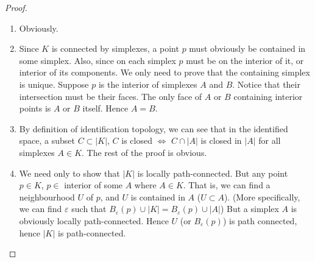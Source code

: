 \begin{proof}
\begin{enumerate}
    \item Obviously.
    \item Since $K$ is connected by simplexes, a point $p$ must
        obviously be contained in some simplex. Also, since on each
        simplex $p$ must be on the interior of it, or interior of its
        components. We only need to prove that the containing simplex
        is unique. Suppose $p$ is the interior of simplexes $A$ and
        $B$. Notice that their intersection must be their faces. The
        only face of $A$ or $B$ containing interior points is $A$ or
        $B$ itself. Hence $A=B$.
    \item By definition of identification topology, we can see that in
        the identified space, a subset $C\subset |K|$, $C$ is closed
        $\Leftrightarrow$ $C\cap |A|$ is closed in $|A|$ for all
        simplexes $A\in K$. The rest of the proof is obvious.
    \item We need only to show that $|K|$ is locally path-connected.
        But any point $p\in K$, $p\in$ interior of some $A$ where
        $A\in K$. That is, we can find a neighbourhood $U$ of $p$, and
        $U$ is contained in $A$ ($U\subset A$). (More specifically, we
        can find $\varepsilon$ such that 
        $B_{\varepsilon}(p)\cup |K| = B_\varepsilon(p)\cup |A|$)
        But a simplex $A$ is obviously locally path-connected. Hence
        $U$ (or $B_\varepsilon(p)$) is path connected, hence $|K|$ is
        path-connected.
\end{enumerate}
\end{proof}

